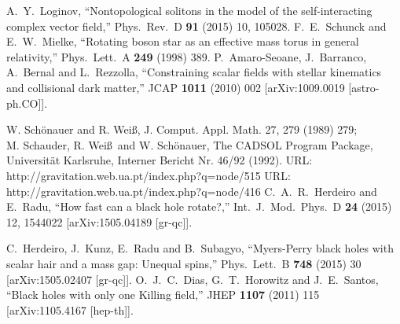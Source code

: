 \begin{small}
\begin{thebibliography}{99}
  A.~Y.~Loginov,
  ``Nontopological solitons in the model of the self-interacting complex vector field,''
  Phys.\ Rev.\ D {\bf 91} (2015) 10,  105028.
  F.~E.~Schunck and E.~W.~Mielke,
  ``Rotating boson star as an effective mass torus in general relativity,''
  Phys.\ Lett.\ A {\bf 249} (1998) 389.
  P.~Amaro-Seoane, J.~Barranco, A.~Bernal and L.~Rezzolla,
  ``Constraining scalar fields with stellar kinematics and collisional dark matter,''
  JCAP {\bf 1011} (2010) 002
  [arXiv:1009.0019 [astro-ph.CO]].

 W. Sch\"onauer and R. Wei\ss ,
 J. Comput. Appl. Math. 27, 279 (1989) 279;
 \\
 M. Schauder, R. Wei\ss\ and W. Sch\"onauer,
 The CADSOL Program Package,
 Universit\"at Karlsruhe, Interner Bericht Nr. 46/92 (1992).  
 URL: http://gravitation.web.ua.pt/index.php?q=node/515
URL: http://gravitation.web.ua.pt/index.php?q=node/416
  C.~A.~R.~Herdeiro and E.~Radu,
  ``How fast can a black hole rotate?,''
  Int.\ J.\ Mod.\ Phys.\ D {\bf 24} (2015) 12,  1544022
  [arXiv:1505.04189 [gr-qc]].

  C.~Herdeiro, J.~Kunz, E.~Radu and B.~Subagyo,
  ``Myers-Perry black holes with scalar hair and a mass gap: Unequal spins,''
  Phys.\ Lett.\ B {\bf 748} (2015) 30
  [arXiv:1505.02407 [gr-qc]].
  O.~J.~C.~Dias, G.~T.~Horowitz and J.~E.~Santos,
  ``Black holes with only one Killing field,''
  JHEP {\bf 1107} (2011) 115
  [arXiv:1105.4167 [hep-th]].



\end{thebibliography}
\end{small}
